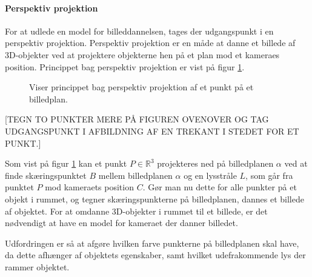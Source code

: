\paragraph{Perspektiv projektion}
\label{sec:perspektiv_projektion}
For at udlede en model for billeddannelsen, tages der udgangspunkt i en perspektiv projektion. Perspektiv projektion er en måde at danne et billede af 3D-objekter ved at projektere objekterne hen på et plan mod et kameraes position\cite{fig:perspective_projection}. Princippet bag perspektiv projektion er vist på figur \ref{fig:perspektiv_projektion}.

\begin{figure}[H]
  \label{fig:perspektiv_projektion}
  \centering
  \caption{Viser princippet bag perspektiv projektion af et punkt på et billedplan.}
\end{figure}

[TEGN TO PUNKTER MERE PÅ FIGUREN OVENOVER OG TAG UDGANGSPUNKT I AFBILDNING AF EN TREKANT I STEDET FOR ET PUNKT.]

Som vist på figur \ref{fig:perspektiv_projektion} kan et punkt $P\in \mathbb{R}^3$ projekteres ned på billedplanen $\alpha$ ved at finde skæringspunktet $B$ mellem billedplanen $\alpha$ og en lysstråle $L$, som går fra punktet $P$ mod kameraets position $C$. Gør man nu dette for alle punkter på et objekt i rummet, og tegner skæringspunkterne på billedplanen, dannes et billede af objektet. For at omdanne 3D-objekter i rummet til et billede, er det nødvendigt at have en model for kameraet der danner billedet. 

Udfordringen er så at afgøre hvilken farve punkterne på billedplanen skal have, da dette afhænger af objektets egenskaber, samt hvilket udefrakommende lys der rammer objektet. 

